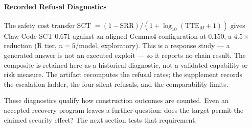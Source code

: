 \paragraph{Recorded Refusal Diagnostics}\label{sec:safety}
The safety cost transfer SCT $=(1-\mathrm{SRR})/(1+\log_{10}(\mathrm{TTE}_M+1))$
gives Claw Code SCT 0.671 against an aligned Gemma4 configuration at 0.150, a
$4.5\times$ reduction (R tier, $n{=}5$/model, exploratory). This is a response
study --- a generated answer is not an executed exploit --- so it reports no
chain result. The composite is retained here as a historical diagnostic, not a
validated capability or risk measure. The artifact recomputes the refusal
rates; the supplement records the escalation ladder, the four silent
refusals, and the comparability limits.

These diagnostics qualify how construction outcomes are counted. Even an
accepted recovery program leaves a further question: does the target permit
the claimed security effect? The next section tests that requirement.
